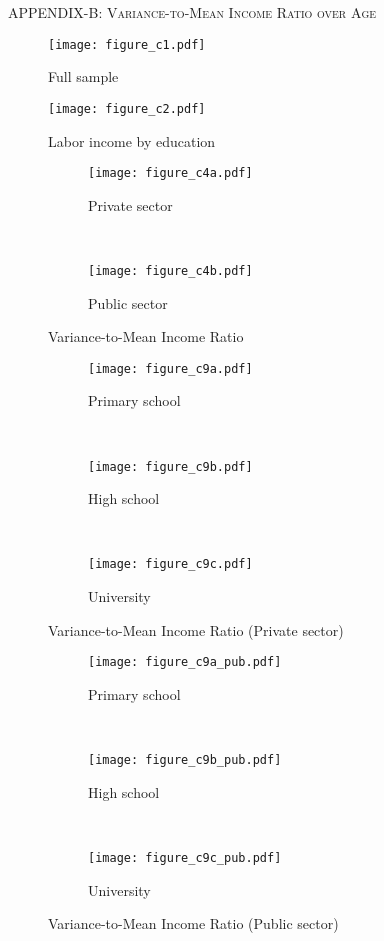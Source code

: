 \documentclass[12pt,author-year]{article}
\begin{document}
\pagebreak


\renewcommand{\thefigure}{B\arabic{figure}} 
\setcounter{figure}{0}   

\begin{center}
	\label{AppendixB}
	\textsc{\large{APPENDIX-B: Variance-to-Mean Income Ratio over Age}}
\end{center}

\begin{figure}[H]
	\centering
	\texttt{[image: figure\_c1.pdf]}
	\caption{Full sample}
\end{figure}

\begin{figure}[H]
	\centering
	\texttt{[image: figure\_c2.pdf]}
	\caption{Labor income by education}
\end{figure}

\begin{figure}[H]
	\centering
	\begin{subfigure}[b]{0.48\textwidth}
		\texttt{[image: figure\_c4a.pdf]}
		\caption{Private sector}
	\end{subfigure}
	~
	\begin{subfigure}[b]{0.48\textwidth}
		\texttt{[image: figure\_c4b.pdf]}
		\caption{Public sector}
	\end{subfigure}    
	\caption{Variance-to-Mean Income Ratio}
\end{figure}

\begin{figure}[H]
	\centering
	\begin{subfigure}[b]{0.3\textwidth}
		\texttt{[image: figure\_c9a.pdf]}
		\caption{Primary school}
	\end{subfigure}
	~
	\begin{subfigure}[b]{0.3\textwidth}
		\texttt{[image: figure\_c9b.pdf]}
		\caption{High school}
	\end{subfigure}
	~
	\begin{subfigure}[b]{0.3\textwidth}
		\texttt{[image: figure\_c9c.pdf]}
		\caption{University}
	\end{subfigure}        
	\caption{Variance-to-Mean Income Ratio (Private sector)}
\end{figure}

\begin{figure}[H]
	\centering
	\begin{subfigure}[b]{0.3\textwidth}
		\texttt{[image: figure\_c9a\_pub.pdf]}
		\caption{Primary school}
	\end{subfigure}
	~
	\begin{subfigure}[b]{0.3\textwidth}
		\texttt{[image: figure\_c9b\_pub.pdf]}
		\caption{High school}
	\end{subfigure}
	~
	\begin{subfigure}[b]{0.3\textwidth}
		\texttt{[image: figure\_c9c\_pub.pdf]}
		\caption{University}
	\end{subfigure}        
	\caption{Variance-to-Mean Income Ratio (Public sector)}
\end{figure}
\end{document}

